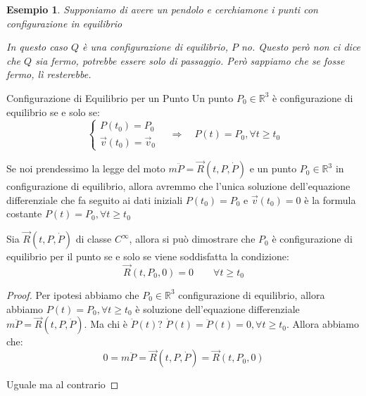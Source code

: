 \documentclass[11pt,a4paper,twoside]{article}
\newtheorem{es}{Esempio}
\theoremstyle{definition}
\begin{document}
\begin{es}
	Supponiamo di avere un pendolo e cerchiamone i punti con configurazione in equilibrio
	\begin{center}
	\end{center}
	In questo caso $Q$ è una configurazione di equilibrio, $P$ no. Questo però non ci dice che $Q$ sia fermo, potrebbe essere solo di passaggio. Però sappiamo che se fosse fermo, lì resterebbe.
\end{es}

\begin{defn}{Configurazione di Equilibrio per un Punto}{}
	Un punto $P_0 \in \mathbb R^3$ è configurazione di equilibrio se e solo se:
	\[ \begin{cases} P(t_0)=P_0\\ \vec v(t_0) = \vec v_0 \end{cases} \quad \Rightarrow \quad P(t) = P_0, \forall t\geq t_0\]
\end{defn}

Se noi prendessimo la legge del moto $m\ddot P = \vec R(t, P, \dot P)$ e un punto $P_0 \in \mathbb R^3$ in configurazione di equilibrio, allora avremmo che l'unica soluzione dell'equazione differenziale che fa seguito ai dati iniziali $P(t_0) = P_0$ e $\vec v(t_0) = 0$ è la formula costante $P(t) = P_0, \forall t \geq t_0$

\begin{prop}{}{}
	Sia $\vec R(t, P, \dot P)$ di classe $C^\infty$, allora si può dimostrare che $P_0$ è configurazione di equilibrio per il punto se e solo se viene soddisfatta la condizione:
	\[ \vec R(t, P_0, 0) = 0\qquad \forall t\geq t_0 \]
\end{prop}

\begin{proof}
	 Per ipotesi abbiamo che $P_0 \in \mathbb R^3$ configurazione di equilibrio, allora abbiamo $P(t) = P_0, \forall t \geq t_0$ è soluzione dell'equazione differenziale $m\ddot P = \vec R(t, P, \dot P)$. Ma chi è $\dot P(t)$? $\dot P(t) = \ddot P(t) = 0, \forall t \geq t_0$. Allora abbiamo che:
	\[ 0 = m\ddot P = \vec R(t,P,\dot P) = \vec R(t, P_0, 0) \]

	 Uguale ma al contrario
\end{proof}
\end{document}
